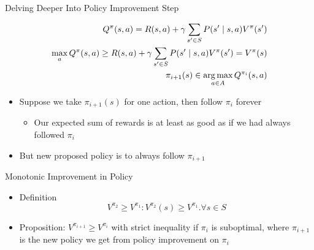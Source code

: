 \begin{frame}[c]{Delving Deeper Into Policy Improvement Step}

\begin{eqnarray}
Q^\pi(s,a) = R(s,a) + \gamma \sum_{s' \in S} P(s' \mid s,a) V^\pi(s')\nonumber\\
\max_a Q^\pi(s,a) \geq R(s,a) + \gamma \sum_{s' \in S} P(s' \mid s,a) V^\pi(s') = V^\pi (s)\nonumber \\
\pi_{i+1}(s) \in \operatorname*{arg\,max}_{a\in A} Q^{\pi_i} (s,a)\nonumber
\end{eqnarray}

\begin{itemize}
	\item Suppose we take $\pi_{i+1}(s)$ for one action, then follow $\pi_i$ forever
	\begin{itemize}
		\item Our expected sum of rewards is at least as good as if we had always
		followed $\pi_i$
	\end{itemize}
	\item But new proposed policy is to always follow $\pi_{i+1}$
\end{itemize}

\end{frame}
\begin{frame}[c]{Monotonic Improvement in Policy}

\begin{itemize}
	\item  Definition
	$$ V^{\pi_2} \geq V^{\pi_1}: V^{\pi_2}(s) \geq V^{\pi_1}. \forall s \in S $$
	\item Proposition: $V^{\pi_{i+1}} \geq V^{\pi_{i}}$ with strict inequality if $\pi_i$ is suboptimal,
	where $\pi_{i+1}$ is the new policy we get from policy improvement on $\pi_i$
\end{itemize}

\end{frame}
